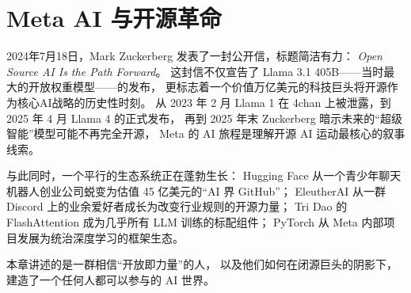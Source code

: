 
\chapter{Meta AI 与开源革命}
\label{ch:meta}

2024年7月18日，Mark Zuckerberg 发表了一封公开信，标题简洁有力：
\textit{Open Source AI Is the Path Forward}。
这封信不仅宣告了 Llama 3.1 405B——当时最大的开放权重模型——的发布，
更标志着一个价值万亿美元的科技巨头将开源作为核心AI战略的历史性时刻。
从 2023 年 2 月 Llama 1 在 4chan 上被泄露，到 2025 年 4 月 Llama 4 的正式发布，
再到 2025 年末 Zuckerberg 暗示未来的``超级智能''模型可能不再完全开源，
Meta 的 AI 旅程是理解开源 AI 运动最核心的叙事线索。

与此同时，一个平行的生态系统正在蓬勃生长：
Hugging Face 从一个青少年聊天机器人创业公司蜕变为估值 45 亿美元的``AI 界 GitHub''；
EleutherAI 从一群 Discord 上的业余爱好者成长为改变行业规则的开源力量；
Tri Dao 的 FlashAttention 成为几乎所有 LLM 训练的标配组件；
PyTorch 从 Meta 内部项目发展为统治深度学习的框架生态。

本章讲述的是一群相信``开放即力量''的人，
以及他们如何在闭源巨头的阴影下，
建造了一个任何人都可以参与的 AI 世界。

